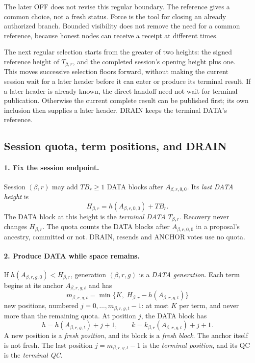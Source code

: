 \documentclass[11pt,a4paper]{article}
\newcommand{\TB}{\mathit{TB}}
\newcommand{\defterm}[1]{\textcolor{rrBlue}{\textit{#1}}}
\begin{document}
The later OFF does not revise this regular boundary. The reference gives
a common choice, not a fresh status. Force is the tool for closing an
already authorized branch. Bounded visibility does not remove the need
for a common reference, because honest nodes can receive a receipt at
different times.

The next regular selection starts from the greater of two heights: the
signed reference height of $T_{\beta,r}$, and the completed session's
opening height plus one. This moves successive selection floors forward,
without making the current session wait for a later header before it can
enter or produce its terminal result. If a later header is already known,
the direct handoff need not wait for terminal publication. Otherwise the
current complete result can be published first; its own inclusion then
supplies a later header. DRAIN keeps the terminal DATA's reference.

\subsection{Session quota, term positions, and DRAIN}
\label{sec:quota}
\paragraph{1. Fix the session endpoint.}
Session $(\beta,r)$ may add $\TB_r\ge1$ DATA blocks after
$A_{\beta,r,0,0}$. Its \defterm{last DATA height} is
\[
 H_{\beta,r}=h(A_{\beta,r,0,0})+\TB_r.
\]
The DATA block at this height is the \defterm{terminal DATA}
$T_{\beta,r}$. Recovery never changes $H_{\beta,r}$. The quota counts the
DATA blocks after $A_{\beta,r,0,0}$ in a proposal's ancestry, committed
or not. DRAIN, resends and ANCHOR votes use no quota.

\paragraph{2. Produce DATA while space remains.}
If $h(A_{\beta,r,g,0})<H_{\beta,r}$, generation $(\beta,r,g)$ is a
\defterm{DATA generation}. Each term begins at its anchor
$A_{\beta,r,g,t}$ and has
\[
 m_{\beta,r,g,t}=\min\{K,\;H_{\beta,r}-h(A_{\beta,r,g,t})\}
\]
new positions, numbered $j=0,\ldots,m_{\beta,r,g,t}-1$: at most $K$ per
term, and never more than the remaining quota. At position $j$, the DATA
block has
\[
 h=h(A_{\beta,r,g,t})+j+1,\qquad
 k=k_{\beta,r}(A_{\beta,r,g,t})+j+1.
\]
A new position is a \defterm{fresh position}, and its block is a
\defterm{fresh block}. The anchor itself is not fresh. The last position
$j=m_{\beta,r,g,t}-1$ is the \defterm{terminal position}, and its QC is
the \defterm{terminal QC}.
\end{document}

